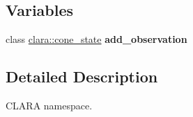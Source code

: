 \subsection*{Variables}
\begin{DoxyCompactItemize}
\item 
\mbox{\label{namespaceclara_a3888f21c2b760462b2ca5cc292f7446b}} 
class \hyperlink{classclara_1_1cone__state}{clara\+::cone\+\_\+state} {\bfseries add\+\_\+observation}
\end{DoxyCompactItemize}


\subsection{Detailed Description}
C\+L\+A\+RA namespace. 

